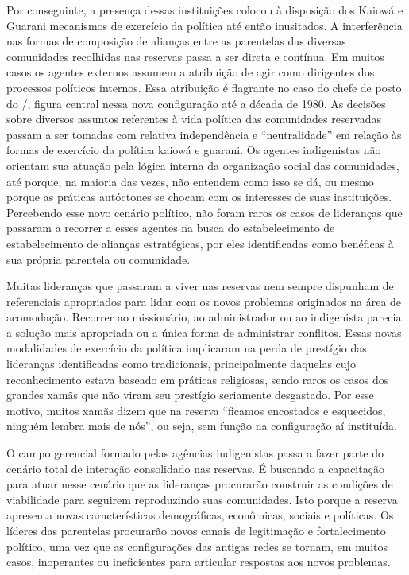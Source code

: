 {{Por conseguinte, a presença dessas instituições colocou à disposição dos
Kaiowá e Guarani mecanismos de exercício da política até então
inusitados. A interferência nas formas de composição de alianças entre
as parentelas das diversas comunidades recolhidas nas reservas passa a
ser direta e contínua. Em muitos casos os agentes externos assumem a
atribuição de agir como dirigentes dos processos políticos internos.
Essa atribuição é flagrante no caso do chefe de posto do /,
figura central nessa nova configuração até a década de 1980. As
decisões sobre diversos assuntos referentes à vida política das
comunidades reservadas passam a ser tomadas com relativa independência
e ``neutralidade'' em relação às formas de exercício da política kaiowá e
guarani. Os agentes indigenistas não orientam sua atuação pela lógica
interna da organização social das comunidades, até porque, na maioria
das vezes, não entendem como isso se dá, ou mesmo porque as práticas
autóctones se chocam com os interesses de suas instituições. Percebendo
esse novo cenário político, não foram raros os casos de lideranças que
passaram a recorrer a esses agentes na busca do estabelecimento de estabelecimento de alianças
estratégicas, por eles identificadas como benéficas à sua própria
parentela ou comunidade.

Muitas lideranças que passaram a viver nas reservas nem sempre dispunham
de referenciais apropriados para lidar com os novos problemas
originados na área de acomodação. Recorrer ao missionário, ao
administrador ou ao indigenista parecia a solução mais apropriada ou a
única forma de administrar conflitos. Essas novas modalidades de
exercício da política implicaram na perda de prestígio das lideranças
identificadas como tradicionais, principalmente daquelas cujo
reconhecimento estava baseado em práticas religiosas, sendo raros os
casos dos grandes xamãs que não viram seu prestígio seriamente
desgastado. Por esse motivo, muitos xamãs dizem que na reserva ``ficamos
encostados e esquecidos, ninguém lembra mais de nós'', ou seja, sem
função na configuração aí instituída.

O campo gerencial formado pelas agências indigenistas passa a fazer
parte do cenário total de interação consolidado nas reservas. É
buscando a capacitação para atuar nesse cenário que as lideranças
procurarão construir as condições de viabilidade para seguirem
reproduzindo suas comunidades. Isto porque a reserva apresenta novas
características demográficas, econômicas, sociais e políticas. Os
líderes das parentelas procurarão novos canais de legitimação e
fortalecimento político, uma vez que as configurações das antigas redes
se tornam, em muitos casos, inoperantes ou ineficientes para articular
respostas aos novos problemas. 

}}
